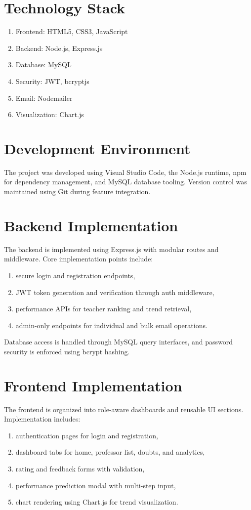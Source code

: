 \section{Technology Stack}
\begin{enumerate}[label=\Alph*., leftmargin=1.5em]
    \item Frontend: HTML5, CSS3, JavaScript
    \item Backend: Node.js, Express.js
    \item Database: MySQL
    \item Security: JWT, bcryptjs
    \item Email: Nodemailer
    \item Visualization: Chart.js
\end{enumerate}

\section{Development Environment}
The project was developed using Visual Studio Code, the Node.js runtime, npm for dependency management, and MySQL database tooling. Version control was maintained using Git during feature integration.

\section{Backend Implementation}
The backend is implemented using Express.js with modular routes and middleware. Core implementation points include:
\begin{enumerate}[label=\Alph*., leftmargin=1.5em]
    \item secure login and registration endpoints,
    \item JWT token generation and verification through auth middleware,
    \item performance APIs for teacher ranking and trend retrieval,
    \item admin-only endpoints for individual and bulk email operations.
\end{enumerate}
Database access is handled through MySQL query interfaces, and password security is enforced using bcrypt hashing.

\section{Frontend Implementation}
The frontend is organized into role-aware dashboards and reusable UI sections. Implementation includes:
\begin{enumerate}[label=\Alph*., leftmargin=1.5em]
    \item authentication pages for login and registration,
    \item dashboard tabs for home, professor list, doubts, and analytics,
    \item rating and feedback forms with validation,
    \item performance prediction modal with multi-step input,
    \item chart rendering using Chart.js for trend visualization.
\end{enumerate}


